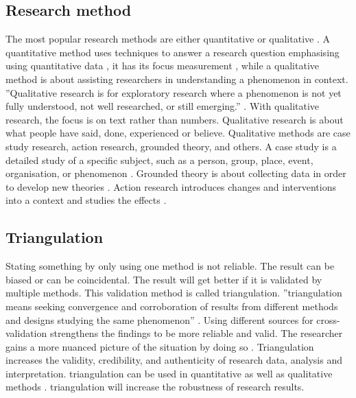 \subsection{Research method}
\label{sub:researchmethods}
The most popular research methods are either quantitative or qualitative \parencite[p.~65]{Recker2012}. A quantitative method uses techniques to answer a research question emphasising using quantitative data \parencite[p.~66]{Recker2012}, it has its focus measurement \parencite[p.~88]{Recker2012}, while a qualitative method is about assisting researchers in understanding a phenomenon in context. ''Qualitative research is for exploratory research where a phenomenon is not yet fully understood, not well researched, or still emerging.'' \textcite[p.~84]{Recker2012}. With qualitative research, the focus is on text rather than numbers. Qualitative research is about what people have said, done, experienced or believe. Qualitative methods are case study research, action research, grounded theory, and others. A case study is a detailed study of a specific subject, such as a person, group, place, event, organisation, or phenomenon \parencite[p.~95]{Recker2012}. Grounded theory is about collecting data in order to develop new theories \parencite[p.~102]{Recker2012}. Action research introduces changes and interventions into a context and studies the effects \parencite[p.~99]{Recker2012}.

\subsection{Triangulation}
\label{sub:triangulation}
Stating something by only using one method is not reliable. The result can be biased or can be coincidental. The result will get better if it is validated by multiple methods. This validation method is called \gls{triangulation}. ''\Gls{triangulation} means seeking convergence and corroboration of results from different methods and designs studying the same phenomenon'' \parencite[p.~104]{Recker2012}. Using different sources for cross-validation strengthens the findings to be more reliable and valid. The researcher gains a more nuanced picture of the situation by doing so \parencite[p.~91]{Recker2012}. Triangulation increases the validity, credibility, and authenticity of research data, analysis and interpretation. \Gls{triangulation} can be used in quantitative as well as qualitative methods \parencite[p.~91]{Recker2012}. \Gls{triangulation} will increase the robustness of research results.

